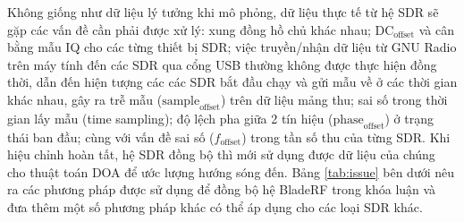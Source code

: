Không giống như dữ liệu lý tưởng khi mô phỏng, dữ liệu thực tế từ hệ SDR sẽ gặp các vấn đề cần phải được xử lý: xung đồng hồ chủ khác nhau; $\textrm{DC}_\textrm{offset}$ và cân bằng mẫu IQ cho các từng thiết bị SDR; việc truyền/nhận dữ liệu từ GNU Radio trên máy tính đến các SDR qua cổng USB thường không được thực hiện đồng thời, dẫn đến hiện tượng các các SDR bắt đầu chạy và gửi mẫu về ở các thời gian khác nhau, gây ra trễ mẫu ($\textrm{sample}_{\textrm{offset}}$) trên dữ liệu mảng thu; sai số trong thời gian lấy mẫu (\textrm{time sampling}); độ lệch pha giữa 2 tín hiệu ($\textrm{phase}_{\textrm{offset}}$) ở trạng thái ban đầu; cùng với vấn đề sai số ($f_{\textrm{offset}}$) trong tần số thu của từng SDR. Khi hiệu chỉnh hoàn tất, hệ SDR đồng bộ thì mới sử dụng được dữ liệu của chúng cho thuật toán DOA để ước lượng hướng sóng đến. Bảng \ref{tab:issue} bên dưới nêu ra các phương pháp được sử dụng để đồng bộ hệ BladeRF trong khóa luận và đưa thêm một số phương pháp khác có thể áp dụng cho các loại SDR khác.


